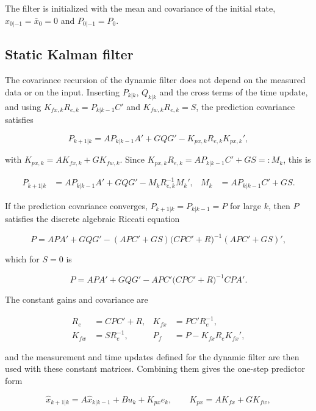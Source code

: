 The filter is initialized with the mean and covariance of the initial state, $\hat x_{0|-1}=\bar x_0=0$ and $P_{0|-1}=P_0$.

\subsection{Static Kalman filter}

The covariance recursion of the dynamic filter does not depend on the measured data or on the input. Inserting $P_{k|k}$, $Q_{k|k}$ and the cross terms of the time update, and using $K_{fx,k}R_{e,k}=P_{k|k-1}C'$ and $K_{fw,k}R_{e,k}=S$, the prediction covariance satisfies

\begin{equation}
  P_{k+1|k}=AP_{k|k-1}A'+GQG'-K_{px,k}R_{e,k}K_{px,k}',
\end{equation}

with $K_{px,k}=AK_{fx,k}+GK_{fw,k}$. Since $K_{px,k}R_{e,k}=AP_{k|k-1}C'+GS=:M_k$, this is

\begin{align}
  P_{k+1|k}&=AP_{k|k-1}A'+GQG'-M_kR_{e,k}^{-1}M_k', & M_k&=AP_{k|k-1}C'+GS .
\end{align}

If the prediction covariance converges, $P_{k+1|k}=P_{k|k-1}=P$ for large $k$, then $P$ satisfies the discrete algebraic Riccati equation

\begin{equation}
  P=APA'+GQG'-(APC'+GS)\big(CPC'+R\big)^{-1}(APC'+GS)' ,
\end{equation}

which for $S=0$ is

\begin{equation}
  P=APA'+GQG'-APC'\big(CPC'+R\big)^{-1}CPA' .
\end{equation}

The constant gains and covariance are

\begin{align}
  R_e&=CPC'+R, & K_{fx}&=PC'R_e^{-1}, \\
  K_{fw}&=SR_e^{-1}, & P_f&=P-K_{fx}R_eK_{fx}',
\end{align}

and the measurement and time updates defined for the dynamic filter are then used with these constant matrices. Combining them gives the one-step predictor form

\begin{equation}
  \hat x_{k+1|k}=A\hat x_{k|k-1}+Bu_k+K_{px}e_k,\qquad K_{px}=AK_{fx}+GK_{fw},
\end{equation}


